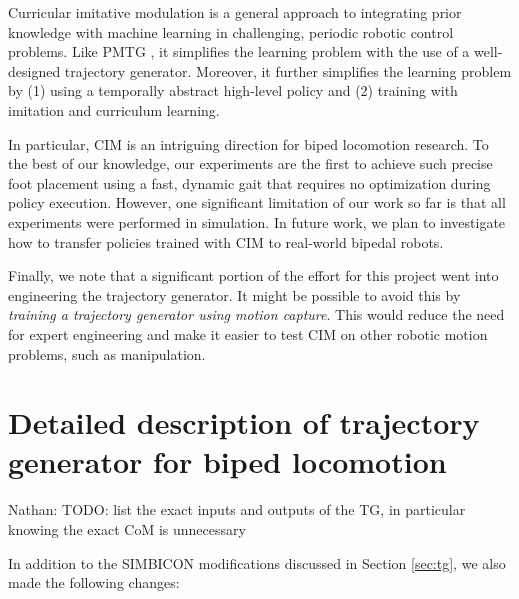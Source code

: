 \documentclass[a4paper]{article}
\newcommand{\nhatch}[1]{{\leavevmode\color{magenta} Nathan: #1}}
\begin{document}
Curricular imitative modulation is a general approach to integrating prior knowledge with machine learning in challenging, periodic robotic control problems.
Like PMTG \citep{iscen2018pmtg}, it simplifies the learning problem with the use of a well-designed trajectory generator.
Moreover, it further simplifies the learning problem by (1) using a temporally abstract high-level policy and (2) training with imitation and curriculum learning.

In particular, CIM is an intriguing direction for biped locomotion research.
To the best of our knowledge, our experiments are the first to achieve such precise foot placement
using a fast, dynamic gait that requires no optimization during policy execution.
However, one significant limitation of our work so far is that all experiments were performed in simulation.
In future work, we plan to investigate how to transfer policies trained with CIM to real-world bipedal robots.

Finally, we note that a significant portion of the effort for this project went into engineering the trajectory generator.
It might be possible to avoid this by \emph{training a trajectory generator using motion capture}.
This would reduce the need for expert engineering and make it easier to test CIM on other robotic motion problems, such as manipulation.




\appendix

\section{Detailed description of trajectory generator for biped locomotion}

\label{app:simbicon}

\nhatch{TODO: list the exact inputs and outputs of the TG, in particular knowing the exact CoM is unnecessary}

In addition to the SIMBICON modifications discussed in Section \ref{sec:tg}, we also made the following changes:
\end{document}
